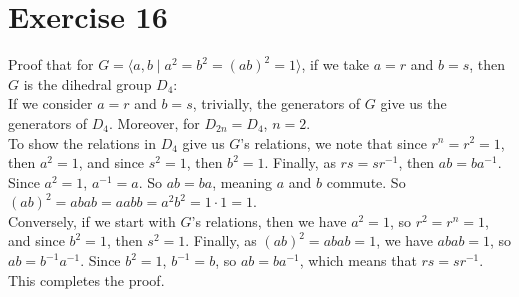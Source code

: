 \documentclass{article}
\begin{document}
    \section*{Exercise 16}
    Proof that for $G = \langle a, b \mid a^2 = b^2 = (ab)^2 = 1 \rangle$,
    if we take $a = r$ and $b = s$,
    then $G$ is the dihedral group $D_4$: \\
    If we consider $a = r$ and $b = s$,
    trivially, the generators of $G$ give us the generators of $D_4$.
    Moreover, for $D_{2n} = D_4$, $n = 2$. \\
    To show the relations in $D_4$ give us $G$'s relations,
    we note that since $r^n = r^2 = 1$,
    then $a^2 = 1$,
    and since $s^2 = 1$,
    then $b^2 = 1$.
    Finally, as $rs = sr^{-1}$,
    then $ab = ba^{-1}$.
    Since $a^2 = 1$, $a^{-1} = a$.
    So $ab = ba$, meaning $a$ and $b$ commute.
    So $(ab)^2 = abab = aabb = a^2b^2 = 1 \cdot 1 = 1$. \\ 
    Conversely, if we start with $G$'s relations,
    then we have $a^2 = 1$,
    so $r^2 = r^n = 1$,
    and since $b^2 = 1$,
    then $s^2 = 1$.
    Finally, as $(ab)^2 = abab = 1$,
    we have $abab = 1$, so $ab = b^{-1}a^{-1}$.
    Since $b^2 = 1$, $b^{-1} = b$,
    so $ab = ba^{-1}$,
    which means that $rs = sr^{-1}$. \\
    This completes the proof.
\end{document}
